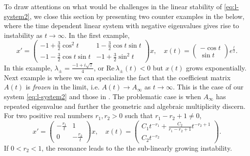 \documentclass[a4paper,11pt]{article}
\theoremstyle{remark}
\begin{document}
To draw attentions on what would be challenges in the linear stability of \eqref{eq:l-system2}, we close this section by presenting two counter examples in the below, where the time dependent linear system with negative eigenvalues gives rise to instability as $t \rightarrow \infty$. In the first example,
$$
x'=\left(\begin{array}{cc} -1 + \frac{3}{2}\cos^2 t & 1-\frac{3}{2}\cos t \sin t \\ -1 -\frac{3}{2}\cos t \sin t & -1 + \frac{3}{2}\sin^2 t \end{array}\right)x, \quad x(t) = \left(\begin{array}{c} -\cos t\\ \sin t \end{array}\right) e^{\tfrac{t}{2}}.$$
In this example, $\lambda_\pm = \tfrac{-1 + i\sqrt{7}}{4}$, or $\textrm{Re}\, \lambda_\pm(t)<0$ but $x(t)$ grows exponentially. Next example is where we can specialize the fact that the coefficient matrix $A(t)$ is {\it frozen} in the limit, i.e. $A(t) \rightarrow A_\infty$ as $t\rightarrow \infty$. This is the case of our system \eqref{eq:l-system2} and those in \cite{FM87}. The problematic case is when $A_\infty$ has repeated eigenvalue and further the geometric and algebraic multiplicity discern. For two positive real numbers $r_1, r_2>0$ such that $r_1-r_2+1\ne0$,
$$
x'=\left(\begin{array}{cc} -\frac{r_1}{t} & 1 \\ 0 & -\frac{r_2}{t}\end{array}\right)x, \quad x(t) = \left(\begin{array}{c} C_1 t^{-r_1} + \frac{C_2}{r_1-r_2+1} t^{-r_2+1}\\ C_2t^{-r_2}\end{array}\right).$$
If $0<r_2<1$, the resonance leads to the the sub-linearly growing instability. %
\end{document}

